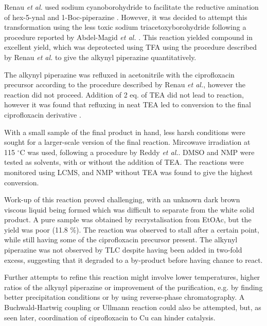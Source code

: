 Renau \textit{et al.}\cite{Renau1996} used sodium cyanoborohydride to facilitate the reductive amination of hex-5-ynal  and 1-Boc-piperazine . However, it was decided to attempt this transformation using the less toxic sodium triacetoxyborohydride following a procedure reported by Abdel-Magid \textit{et al.} \cite{Abdel-Magid1996}. This reaction yielded compound  in excellent yield, which was deprotected using TFA using the procedure described by Renau \textit{et al.}\cite{Renau1996} to give the alkynyl piperazine  quantitatively. 

The alkynyl piperazine  was refluxed in acetonitrile with the ciprofloxacin precursor  according to the procedure described by Renau \textit{et al.}\cite{Renau1996}, however the reaction did not proceed. Addition of 2 eq. of TEA did not lead to reaction, however it was found that refluxing in neat TEA led to conversion to the final ciprofloxacin derivative .

With a small sample of the final product in hand, less harsh conditions were sought for a larger-scale version of the final reaction. Mircowave irradiation at 115 $^{\circ}$C was used, following a procedure by Reddy \textit{et al.}\cite{Reddy2001}. DMSO and NMP were tested as solvents, with or without the addition of TEA. The reactions were monitored using LCMS, and NMP without TEA was found to give the highest conversion. 

Work-up of this reaction proved challenging, with an unknown dark brown viscous liquid being formed which was difficult to separate from the white solid product. A pure sample was obtained by recrystalisation from EtOAc, but the yield was poor (11.8 \%). The reaction was observed to stall after a certain point, while still having some of the ciprofloxacin precursor  present. The alkynyl piperazine  was not observed by TLC despite having been added in two-fold excess, suggesting that it degraded to a by-product before having chance to react. 

Further attempts to refine this reaction might involve lower temperatures, higher ratios of the alkynyl piperazine  or improvement of the purification, e.g. by finding better precipitation conditions or by using reverse-phase chromatography. A Buchwald-Hartwig coupling or Ullmann reaction could also be attempted, but, as seen later, coordination of ciprofloxacin to Cu can hinder catalysis.

